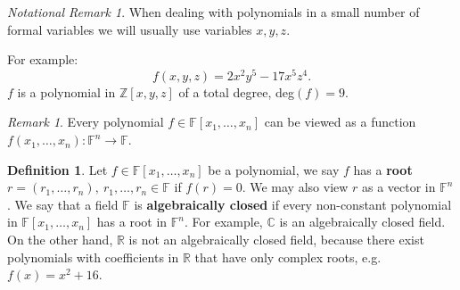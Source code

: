 \documentclass[thesis=M,english]{FITthesis}[2012/10/20]
\theoremstyle{remark}
\newtheorem*{RM}{Remark}
\newtheorem*{NRM}{Notational Remark}
\theoremstyle{definition}
\newtheorem{DF}{Definition}[section]
\begin{document}
\begin{NRM}
\noindent When dealing with polynomials in a small number of formal variables we will usually use variables $x,y,z$. 
\end{NRM}
\noindent For example:
$$
f(x,y,z) = 2x^2y^5 - 17x^5z^4.
$$
$f$ is a polynomial in $\mathbb{Z}[x,y,z]$ of a total degree, deg$(f)=9.$
\begin{RM}
Every polynomial $f \in \mathbb{F}[x_1,\ldots,x_n]$ can be viewed as a function $f(x_1,\ldots,x_n) : \mathbb{F}^n \to \mathbb{F}$.
\end{RM}
\begin{DF}
Let $f \in \mathbb{F}[x_1,\ldots,x_n]$ be a polynomial, we say $f$ has a \textbf{root} $r = (r_1, \ldots, r_n),\ r_1, \ldots, r_n \in \mathbb{F}$ if $f(r) = 0.$ We may also view $r$ as a vector in $\mathbb{F}^n$. We say that a field $\mathbb{F}$ is \textbf{algebraically closed} if every non-constant polynomial in $\mathbb{F}[x_1,\ldots,x_n]$ has a root in $\mathbb{F}^n$. For example, $\mathbb{C}$ is an algebraically closed field. On the other hand, $\mathbb{R}$ is not an algebraically  closed field, because there exist polynomials with coefficients in $\mathbb{R}$ that have only complex roots, e.g. $f(x) = x^2 + 16$.
\end{DF}
\end{document}
